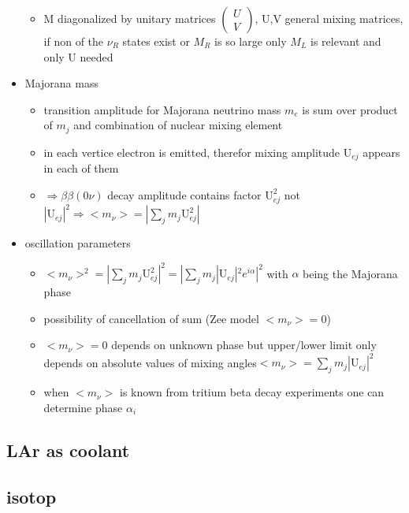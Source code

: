 \begin{itemize}
\begin{itemize}
\item M diagonalized by unitary matrices \(\begin{pmatrix} U \\ V \end{pmatrix}\), U,V general mixing matrices, if non of the \(\nu_R\) states exist or \(M_R\) is so large only \(M_L\) is relevant and only U needed
\end{itemize}
\item Majorana mass
\begin{itemize}
\item transition amplitude for Majorana neutrino mass \(m_e\) is sum over product of \(m_j\) and combination of nuclear mixing element
\item in each vertice electron is emitted, therefor mixing amplitude \(\mathrm{U}_{ej}\) appears in each of them
\item \(\Rightarrow \beta\beta(0\nu)\) decay amplitude contains factor \(\mathrm{U}_{ej}^2\) not \(|\mathrm{U}_{ej}|^2 \Rightarrow <m_\nu> = |\sum_jm_j\mathrm{U}_{ej}^2|\) 
\end{itemize}
\item oscillation parameters
\begin{itemize}
\item \(<m_\nu>^2 = |\sum_jm_j\mathrm{U}_{ej}^2|^2 = |\sum_jm_j|\mathrm{U}_{ej}|^2e^{i\alpha}|^2\) with \(\alpha\) being the Majorana phase
\item possibility of cancellation of sum (Zee model \(<m_\nu> = 0\))
\item \(<m_\nu> = 0\) depends on unknown phase but upper/lower limit only depends on absolute values of mixing angles\(<m_\nu> = \sum_jm_j|\mathrm{U}_{ej}|^2\)
\item when \(<m_\nu>\) is known from tritium beta decay experiments one can determine phase \(\alpha_i\)
\end{itemize}
\end{itemize}

 
\subsection{LAr as coolant} 
\label{sec:LArcoolant}



% 

\subsection{ isotop}
\label{sec:Kry85}




